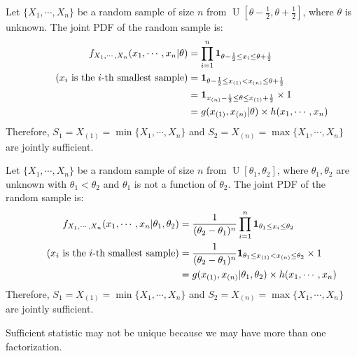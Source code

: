 \documentclass{huhtakm-template-book-v2}
\DeclareMathOperator{\U}{U}
\begin{document}
\begin{eg}
	Let $\{X_{1},\cdots,X_{n}\}$ be a random sample of size $n$ from $\U[\theta-\frac{1}{2},\theta+\frac{1}{2}]$, where $\theta$ is unknown. The joint PDF of the random sample is:
	\begin{align*}
		f_{X_{1},\cdots,X_{n}}(x_{1},\cdots,x_{n}|\theta)&=\prod_{i=1}^{n}\mathbf{1}_{\theta-\frac{1}{2}\leq x_{i}\leq\theta+\frac{1}{2}}\\
		\tag{$x_{i}$ is the $i$-th smallest sample}
		&=\mathbf{1}_{\theta-\frac{1}{2}\leq x_{(1)}<x_{(n)}\leq\theta+\frac{1}{2}}\\
		&=\mathbf{1}_{x_{(n)}-\frac{1}{2}\leq\theta\leq x_{(1)}+\frac{1}{2}}\times 1\\
		&=g(x_{(1)},x_{(n)}|\theta)\times h(x_{1},\cdots,x_{n})
	\end{align*}
	Therefore, $S_{1}=X_{(1)}=\min\{X_{1},\cdots,X_{n}\}$ and $S_{2}=X_{(n)}=\max\{X_{1},\cdots,X_{n}\}$ are jointly sufficient.
\end{eg}
\begin{eg}
	Let $\{X_{1},\cdots,X_{n}\}$ be a random sample of size $n$ from $\U[\theta_{1},\theta_{2}]$, where $\theta_{1},\theta_{2}$ are unknown with $\theta_{1}<\theta_{2}$ and $\theta_{1}$ is not a function of $\theta_{2}$. The joint PDF of the random sample is:
	\begin{align*}
		f_{X_{1},\cdots,X_{n}}(x_{1},\cdots,x_{n}|\theta_{1},\theta_{2})&=\frac{1}{(\theta_{2}-\theta_{1})^{n}}\prod_{i=1}^{n}\mathbf{1}_{\theta_{1}\leq x_{i}\leq\theta_{2}}\\
		\tag{$x_{i}$ is the $i$-th smallest sample}
		&=\frac{1}{(\theta_{2}-\theta_{1})^{n}}\mathbf{1}_{\theta_{1}\leq x_{(1)}<x_{(n)}\leq\theta_{2}}\times 1\\
		&=g(x_{(1)},x_{(n)}|\theta_{1},\theta_{2})\times h(x_{1},\cdots,x_{n})
	\end{align*}
	Therefore, $S_{1}=X_{(1)}=\min\{X_{1},\cdots,X_{n}\}$ and $S_{2}=X_{(n)}=\max\{X_{1},\cdots,X_{n}\}$ are jointly sufficient.
\end{eg}
\begin{rem}
	Sufficient statistic may not be unique because we may have more than one factorization.
\end{rem}
\end{document}
